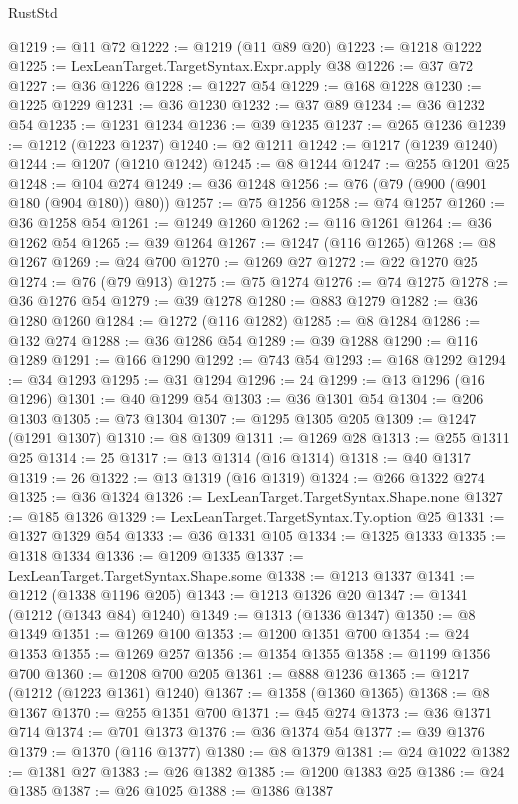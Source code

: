 \begin{lexlean}{RustStd}
\begin{coremodule}
@1219 := @11 @72
@1222 := @1219 (@11 @89 @20)
@1223 := @1218 @1222
@1225 := LexLeanTarget.TargetSyntax.Expr.apply @38
@1226 := @37 @72
@1227 := @36 @1226
@1228 := @1227 @54
@1229 := @168 @1228
@1230 := @1225 @1229
@1231 := @36 @1230
@1232 := @37 @89
@1234 := @36 @1232 @54
@1235 := @1231 @1234
@1236 := @39 @1235
@1237 := @265 @1236
@1239 := @1212 (@1223 @1237)
@1240 := @2 @1211
@1242 := @1217 (@1239 @1240)
@1244 := @1207 (@1210 @1242)
@1245 := @8 @1244
@1247 := @255 @1201 @25
@1248 := @104 @274
@1249 := @36 @1248
@1256 := @76 (@79 (@900 (@901 @180 (@904 @180)) @80))
@1257 := @75 @1256
@1258 := @74 @1257
@1260 := @36 @1258 @54
@1261 := @1249 @1260
@1262 := @116 @1261
@1264 := @36 @1262 @54
@1265 := @39 @1264
@1267 := @1247 (@116 @1265)
@1268 := @8 @1267
@1269 := @24 @700
@1270 := @1269 @27
@1272 := @22 @1270 @25
@1274 := @76 (@79 @913)
@1275 := @75 @1274
@1276 := @74 @1275
@1278 := @36 @1276 @54
@1279 := @39 @1278
@1280 := @883 @1279
@1282 := @36 @1280 @1260
@1284 := @1272 (@116 @1282)
@1285 := @8 @1284
@1286 := @132 @274
@1288 := @36 @1286 @54
@1289 := @39 @1288
@1290 := @116 @1289
@1291 := @166 @1290
@1292 := @743 @54
@1293 := @168 @1292
@1294 := @34 @1293
@1295 := @31 @1294
@1296 := 24
@1299 := @13 @1296 (@16 @1296)
@1301 := @40 @1299 @54
@1303 := @36 @1301 @54
@1304 := @206 @1303
@1305 := @73 @1304
@1307 := @1295 @1305 @205
@1309 := @1247 (@1291 @1307)
@1310 := @8 @1309
@1311 := @1269 @28
@1313 := @255 @1311 @25
@1314 := 25
@1317 := @13 @1314 (@16 @1314)
@1318 := @40 @1317
@1319 := 26
@1322 := @13 @1319 (@16 @1319)
@1324 := @266 @1322 @274
@1325 := @36 @1324
@1326 := LexLeanTarget.TargetSyntax.Shape.none
@1327 := @185 @1326
@1329 := LexLeanTarget.TargetSyntax.Ty.option @25
@1331 := @1327 @1329 @54
@1333 := @36 @1331 @105
@1334 := @1325 @1333
@1335 := @1318 @1334
@1336 := @1209 @1335
@1337 := LexLeanTarget.TargetSyntax.Shape.some
@1338 := @1213 @1337
@1341 := @1212 (@1338 @1196 @205)
@1343 := @1213 @1326 @20
@1347 := @1341 (@1212 (@1343 @84) @1240)
@1349 := @1313 (@1336 @1347)
@1350 := @8 @1349
@1351 := @1269 @100
@1353 := @1200 @1351 @700
@1354 := @24 @1353
@1355 := @1269 @257
@1356 := @1354 @1355
@1358 := @1199 @1356 @700
@1360 := @1208 @700 @205
@1361 := @888 @1236
@1365 := @1217 (@1212 (@1223 @1361) @1240)
@1367 := @1358 (@1360 @1365)
@1368 := @8 @1367
@1370 := @255 @1351 @700
@1371 := @45 @274
@1373 := @36 @1371 @714
@1374 := @701 @1373
@1376 := @36 @1374 @54
@1377 := @39 @1376
@1379 := @1370 (@116 @1377)
@1380 := @8 @1379
@1381 := @24 @1022
@1382 := @1381 @27
@1383 := @26 @1382
@1385 := @1200 @1383 @25
@1386 := @24 @1385
@1387 := @26 @1025
@1388 := @1386 @1387

\end{coremodule}
\end{lexlean}
